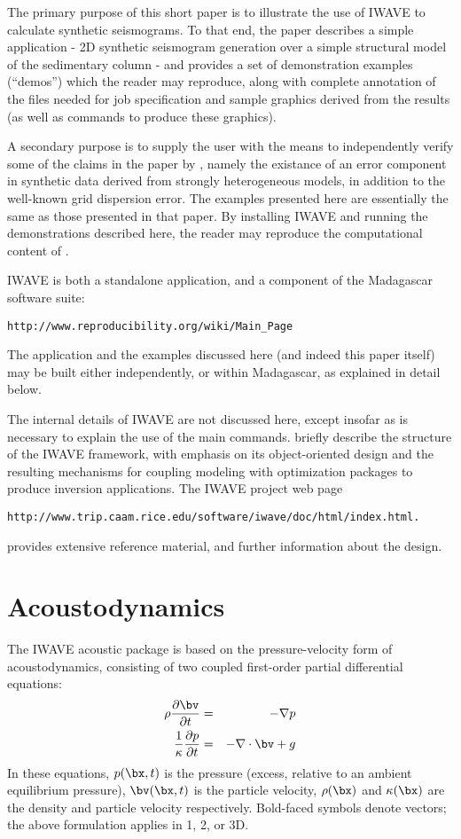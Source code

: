 The primary purpose of this short paper is to illustrate the use of
IWAVE to calculate synthetic seismograms. To that end, the paper
describes a simple application - 2D synthetic seismogram generation
over a simple structural model of the sedimentary column - and
provides a set of demonstration examples (``demos'') which the reader
may reproduce, along with complete annotation of the files needed for
job specification and sample graphics derived from the results (as
well as commands to produce these graphics).

A secondary purpose is to supply the user with the means to
independently verify some of the claims in the paper by
\cite{SymesVdovina:09}, namely the existance of an error component in
synthetic data derived from strongly heterogeneous models, in addition
to the well-known grid dispersion error. The examples presented here
are essentially the same as those presented in that paper. By
installing IWAVE and running the demonstrations described here, the
reader may reproduce the computational content of \cite[]{SymesVdovina:09}.

IWAVE is both a standalone application, and a component of the
Madagascar software suite:
\begin{verbatim}
http://www.reproducibility.org/wiki/Main_Page
\end{verbatim}
The application and the examples discussed
here (and indeed this paper itself) may be built either independently, or within Madagascar, as
explained in detail below.

The internal details of IWAVE are not discussed here, except insofar
as is necessary to explain the use of the main
commands. \cite{GeoPros:11} briefly describe the structure of the
IWAVE framework, with emphasis on its object-oriented design and the
resulting mechanisms for coupling modeling with optimization packages
to produce inversion applications. The IWAVE project web page 
\begin{verbatim}
http://www.trip.caam.rice.edu/software/iwave/doc/html/index.html.
\end{verbatim}
provides extensive reference material, and further information about
the design.
 

\section{Acoustodynamics}
The IWAVE acoustic package is based on the pressure-velocity form of
acoustodynamics, consisting of two coupled first-order partial
differential equations:
\begin{eqnarray}
\label{awe}
\rho \frac{\partial \bv}{\partial t} &=& - \nabla p \\
\frac{1}{\kappa}\frac{\partial p}{\partial t} &=& -\nabla \cdot \bv + g
\end{eqnarray}
In these equations, $p(\bx,t)$ is the pressure (excess, relative to an
ambient equilibrium pressure), $\bv(\bx,t)$ is the particle velocity,
$\rho(\bx)$ and $\kappa(\bx)$ are the density and particle velocity
respectively. Bold-faced symbols denote vectors; the above formulation
applies in 1, 2, or 3D.

